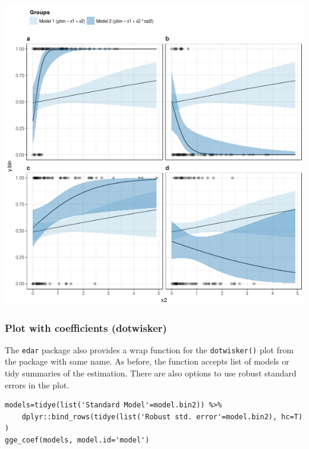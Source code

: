 \documentclass[a4paper]{article}
\begin{document}
\begin{enumerate}
\begin{center}
\includegraphics[width=.9\linewidth]{fig-fitted-many-models-bin-2.png}
\end{center}
\end{enumerate}

\subsubsection{Plot with coefficients (dotwisker)}
\label{sec:org343e683}
The \texttt{edar} package also provides a wrap function for the \texttt{dotwisker()} plot from the package with same name. As before, the function accepts list of models or tidy summaries of the estimation. There are also options to use robust standard errors in the plot.

\lstset{numbers=left,language=r,label= ,caption= ,captionpos=b}
\begin{lstlisting}
models=tidye(list('Standard Model'=model.bin2)) %>%
    dplyr::bind_rows(tidye(list('Robust std. error'=model.bin2), hc=T) )
gge_coef(models, model.id='model')
\end{lstlisting}
\end{document}
